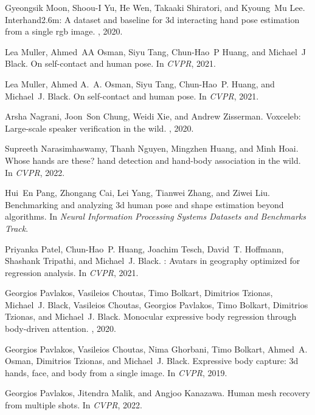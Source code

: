 \documentclass[10pt,twocolumn,letterpaper]{article}
\begin{document}
\begin{thebibliography}{10}
Gyeongsik Moon, Shoou-I Yu, He Wen, Takaaki Shiratori, and Kyoung~Mu Lee.
\newblock Interhand2.6m: A dataset and baseline for 3d interacting hand pose
  estimation from a single rgb image.
, 2020.

Lea Muller, Ahmed~AA Osman, Siyu Tang, Chun-Hao~P Huang, and Michael~J Black.
\newblock On self-contact and human pose.
\newblock In {\em CVPR}, 2021.

Lea Muller, Ahmed A.~A. Osman, Siyu Tang, Chun-Hao~P. Huang, and Michael~J.
  Black.
\newblock On self-contact and human pose.
\newblock In {\em CVPR}, 2021.

Arsha Nagrani, Joon~Son Chung, Weidi Xie, and Andrew Zisserman.
\newblock Voxceleb: Large-scale speaker verification in the wild.
, 2020.

Supreeth Narasimhaswamy, Thanh Nguyen, Mingzhen Huang, and Minh Hoai.
\newblock Whose hands are these? hand detection and hand-body association in
  the wild.
\newblock In {\em CVPR}, 2022.

Hui~En Pang, Zhongang Cai, Lei Yang, Tianwei Zhang, and Ziwei Liu.
\newblock Benchmarking and analyzing 3d human pose and shape estimation beyond
  algorithms.
\newblock In {\em Neural Information Processing Systems Datasets and Benchmarks
  Track}.

Priyanka Patel, Chun-Hao~P. Huang, Joachim Tesch, David~T. Hoffmann, Shashank
  Tripathi, and Michael~J. Black.
: Avatars in geography optimized for regression analysis.
\newblock In {\em CVPR}, 2021.

Georgios Pavlakos, Vasileios Choutas, Timo Bolkart, Dimitrios Tzionas,
  Michael~J. Black, Vasileios Choutas, Georgios Pavlakos, Timo Bolkart,
  Dimitrios Tzionas, and Michael~J. Black.
\newblock Monocular expressive body regression through body-driven attention.
, 2020.

Georgios Pavlakos, Vasileios Choutas, Nima Ghorbani, Timo Bolkart, Ahmed~A.
  Osman, Dimitrios Tzionas, and Michael~J. Black.
\newblock Expressive body capture: 3d hands, face, and body from a single
  image.
\newblock In {\em CVPR}, 2019.

Georgios Pavlakos, Jitendra Malik, and Angjoo Kanazawa.
\newblock Human mesh recovery from multiple shots.
\newblock In {\em CVPR}, 2022.


\end{thebibliography}
\end{document}
